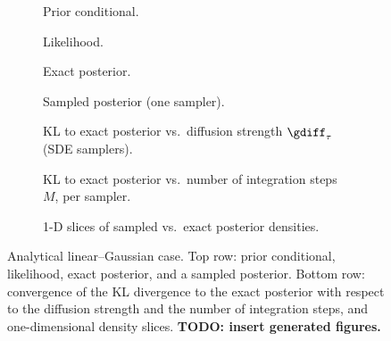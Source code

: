 \begin{figure}[ht]
    \centering
    \begin{subfigure}{0.24\linewidth}\centering
        \caption{Prior conditional.}\label{fig:an_prior}
    \end{subfigure}\hfill
    \begin{subfigure}{0.24\linewidth}\centering
        \caption{Likelihood.}\label{fig:an_like}
    \end{subfigure}\hfill
    \begin{subfigure}{0.24\linewidth}\centering
        \caption{Exact posterior.}\label{fig:an_true}
    \end{subfigure}\hfill
    \begin{subfigure}{0.24\linewidth}\centering
        \caption{Sampled posterior (one sampler).}\label{fig:an_sampled}
    \end{subfigure}

    \vspace{4pt}
    \begin{subfigure}{0.32\linewidth}\centering
        \caption{KL to exact posterior vs.\ diffusion strength $\gdiff_\tau$ (SDE samplers).}\label{fig:an_kl_diff}
    \end{subfigure}\hfill
    \begin{subfigure}{0.32\linewidth}\centering
        \caption{KL to exact posterior vs.\ number of integration steps $M$, per sampler.}\label{fig:an_kl_steps}
    \end{subfigure}\hfill
    \begin{subfigure}{0.32\linewidth}\centering
        \caption{1-D slices of sampled vs.\ exact posterior densities.}\label{fig:an_slices}
    \end{subfigure}
    \caption{Analytical linear--Gaussian case. Top row: prior conditional, likelihood, exact posterior, and a sampled posterior. Bottom row: convergence of the KL divergence to the exact posterior with respect to the diffusion strength and the number of integration steps, and one-dimensional density slices. \textbf{TODO: insert generated figures.}}
    \label{fig:analytical_panels}
\end{figure}

